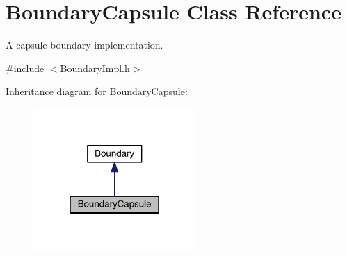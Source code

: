 \hypertarget{classBoundaryCapsule}{\section{Boundary\+Capsule Class Reference}
\label{classBoundaryCapsule}
}


A capsule boundary implementation.  




{\ttfamily \#include $<$Boundary\+Impl.\+h$>$}



Inheritance diagram for Boundary\+Capsule\+:\nopagebreak
\begin{figure}[H]
\begin{center}
\leavevmode
\includegraphics[width=175pt]{classBoundaryCapsule__inherit__graph}
\end{center}
\end{figure}



